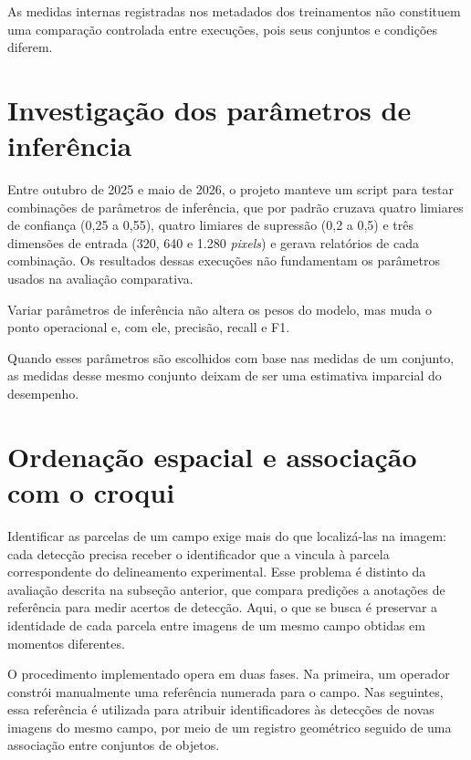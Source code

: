 As medidas internas registradas nos metadados dos treinamentos n\~ao constituem uma compara\c{c}\~ao controlada entre execu\c{c}\~oes, pois seus conjuntos e condi\c{c}\~oes diferem.

\section{Investiga\c{c}\~ao dos par\^ametros de infer\^encia}
\label{sec:investigacao-parametros-inferencia}

Entre outubro de 2025 e maio de 2026, o projeto manteve um script para testar combina\c{c}\~oes de par\^ametros de infer\^encia, que por padr\~ao cruzava quatro limiares de confian\c{c}a (0,25 a 0,55), quatro limiares de supress\~ao (0,2 a 0,5) e tr\^es dimens\~oes de entrada (320, 640 e 1.280 \textit{pixels}) e gerava relat\'orios de cada combina\c{c}\~ao. Os resultados dessas execu\c{c}\~oes n\~ao fundamentam os par\^ametros usados na avalia\c{c}\~ao comparativa.

Variar par\^ametros de infer\^encia n\~ao altera os pesos do modelo, mas muda o ponto operacional e, com ele, precis\~ao, recall e F1.

Quando esses par\^ametros s\~ao escolhidos com base nas medidas de um conjunto, as medidas desse mesmo conjunto deixam de ser uma estimativa imparcial do desempenho.

\section{Ordena\c{c}\~ao espacial e associa\c{c}\~ao com o croqui}
\label{sec:ordenacao-espacial-croqui}

Identificar as parcelas de um campo exige mais do que localiz\'a-las na imagem: cada detec\c{c}\~ao precisa receber o identificador que a vincula \`a parcela correspondente do delineamento experimental. Esse problema \'e distinto da avalia\c{c}\~ao descrita na subse\c{c}\~ao anterior, que compara predi\c{c}\~oes a anota\c{c}\~oes de refer\^encia para medir acertos de detec\c{c}\~ao. Aqui, o que se busca \'e preservar a identidade de cada parcela entre imagens de um mesmo campo obtidas em momentos diferentes.

O procedimento implementado opera em duas fases. Na primeira, um operador constr\'oi manualmente uma refer\^encia numerada para o campo. Nas seguintes, essa refer\^encia \'e utilizada para atribuir identificadores \`as detec\c{c}\~oes de novas imagens do mesmo campo, por meio de um registro geom\'etrico seguido de uma associa\c{c}\~ao entre conjuntos de objetos.

